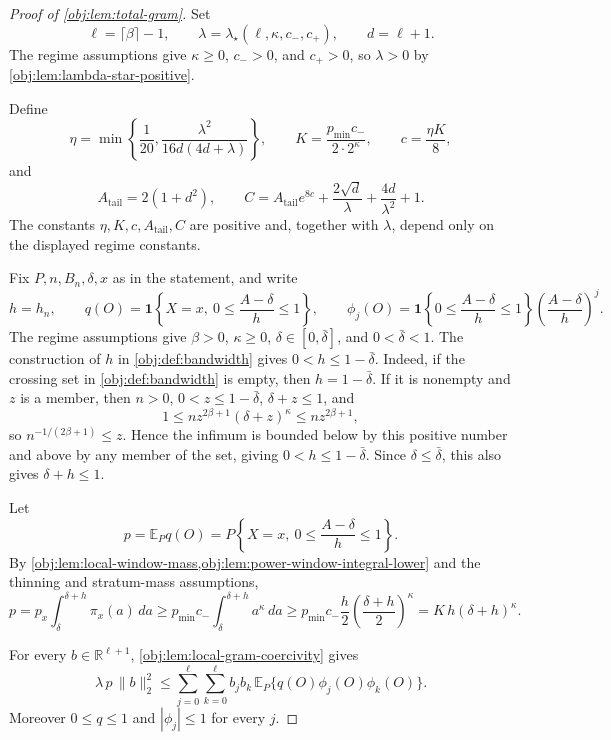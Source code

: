 \documentclass[11pt]{article}
\begin{document}
\begin{proof}[Proof of \cref{obj:lem:total-gram}]
Set
\[
\ell=\lceil\beta\rceil-1,\qquad
\lambda=\lambda_\star(\ell,\kappa,c_-,c_+),\qquad
d=\ell+1 .
\]
The regime assumptions give \(\kappa\ge0\), \(c_->0\), and \(c_+>0\), so \(\lambda>0\) by \cref{obj:lem:lambda-star-positive}. %

Define
\[
\eta=
\min\left\{
\frac1{20},
\frac{\lambda^2}{16d(4d+\lambda)}
\right\},
\qquad
K=\frac{p_{\min}c_-}{2\cdot2^\kappa},
\qquad
c=\frac{\eta K}{8},
\]
and
\[
A_{\mathrm{tail}}=2(1+d^2),\qquad
C=
A_{\mathrm{tail}}e^{8c}+\frac{2\sqrt d}{\lambda}+\frac{4d}{\lambda^2}+1 .
\]
The constants \(\eta,K,c,A_{\mathrm{tail}},C\) are positive and, together with \(\lambda\), depend only on the displayed regime constants. %

Fix \(P,n,B_n,\delta,x\) as in the statement, and write
\[
h=h_n,
\qquad
q(O)=\mathbf 1\left\{X=x,\ 0\le\frac{A-\delta}{h}\le1\right\},
\qquad
\phi_j(O)=
\mathbf 1\left\{0\le\frac{A-\delta}{h}\le1\right\}
\left(\frac{A-\delta}{h}\right)^j .
\]
The regime assumptions give \(\beta>0\), \(\kappa\ge0\), \(\delta\in[0,\bar\delta]\), and \(0<\bar\delta<1\).  The construction of \(h\) in \cref{obj:def:bandwidth} gives \(0<h\le1-\bar\delta\).  Indeed, if the crossing set in \cref{obj:def:bandwidth} is empty, then \(h=1-\bar\delta\).  If it is nonempty and \(z\) is a member, then \(n>0\), \(0<z\le1-\bar\delta\), \(\delta+z\le1\), and
\[
1\le n z^{2\beta+1}(\delta+z)^\kappa\le n z^{2\beta+1},
\]
so \(n^{-1/(2\beta+1)}\le z\).  Hence the infimum is bounded below by this positive number and above by any member of the set, giving \(0<h\le1-\bar\delta\).  Since \(\delta\le\bar\delta\), this also gives \(\delta+h\le1\). %

Let
\[
p=\mathbb E_P q(O)
=
P\left\{X=x,\ 0\le\frac{A-\delta}{h}\le1\right\}.
\]
By \cref{obj:lem:local-window-mass,obj:lem:power-window-integral-lower} and the thinning and stratum-mass assumptions,
\[
p
=
p_x\int_{\delta}^{\delta+h}\pi_x(a)\,da
\ge
p_{\min}c_-\int_{\delta}^{\delta+h}a^\kappa\,da
\ge
p_{\min}c_-\frac h2\left(\frac{\delta+h}{2}\right)^\kappa
=
K\,h(\delta+h)^\kappa .
\]

For every \(b\in\mathbb R^{\ell+1}\), \cref{obj:lem:local-gram-coercivity} gives
\[
\lambda\,p\,\|b\|_2^2
\le
\sum_{j=0}^{\ell}\sum_{k=0}^{\ell}
b_jb_k\,\mathbb E_P\{q(O)\phi_j(O)\phi_k(O)\}.
\]
Moreover \(0\le q\le1\) and \(|\phi_j|\le1\) for every \(j\). %


\end{proof}
\end{document}
